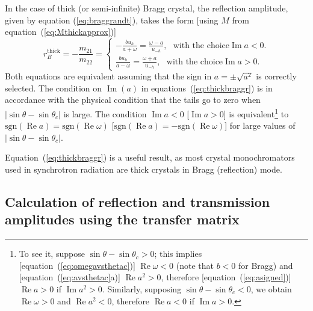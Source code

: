 \documentclass[preprint]{iucr}              %
\newcommand{\inblue}[1]{{\color{blue}#1}}
\begin{document}
In the case of thick (or semi-infinite) Bragg crystal, the reflection amplitude, given by equation (\ref{eq:braggrandt}), takes the form [using $M$ from equation~(\ref{eq:Mthickapprox})]
\begin{equation}\label{eq:thickbraggr}
    r_B^{\text{thick}} = -\frac{m_{21}}{m_{22}} =
    \begin{cases} 
    -\frac{b u_h}{a+\omega}=\frac{\omega-a}{u_{-h}}, ~~~ \text{with the choice} \operatorname{Im} a <0.
    \\
    \frac{b u_h}{a-\omega} = \frac{\omega+a}{u_{-h}}, ~~~ \text{with the choice} \operatorname{Im} a>0.
    \end{cases}
\end{equation}
Both equations are equivalent \inblue{assuming that the sign in $a=\pm \sqrt{a^2}$ is correctly selected}. The condition on $\operatorname{Im}(a)$ in equations~(\ref{eq:thickbraggr}) is in accordance with the physical condition that the tails go to zero when $|\sin\theta-\sin\theta_c|$ is large.
The condition $\operatorname{Im} a < 0$ [$\operatorname{Im} a > 0$] is equivalent\footnote{
To see it, suppose $\sin\theta-\sin\theta_c>0$; this implies [equation~(\ref{eq:omegavsthetac})] $\operatorname{Re}\omega<0$ (note that $b<0$ for Bragg) and 
[equation~(\ref{eq:avsthetac}a)] $\operatorname{Re}a^2>0$, therefore [equation~(\ref{eq:asigned})] $\operatorname{Re}a>0$ if $\operatorname{Im}a^2>0$. 
Similarly, supposing $\sin\theta-\sin\theta_c<0$, we obtain $\operatorname{Re}\omega>0$ and $\operatorname{Re}a^2<0$, therefore $\operatorname{Re}a<0$ if $\operatorname{Im}a>0$. 
}
to $\text{sgn}(\operatorname{Re}a)=\text{sgn}(\operatorname{Re}\omega)$ [$\text{sgn}(\operatorname{Re}a)=-\text{sgn}(\operatorname{Re}\omega)$] for large values of $|\sin\theta-\sin\theta_c|$.
 
Equation~(\ref{eq:thickbraggr}) is a useful result, as most crystal monochromators used in synchrotron radiation are thick crystals in Bragg (reflection) mode. 

\subsection{Calculation of reflection and transmission amplitudes using the transfer matrix}
\end{document}
